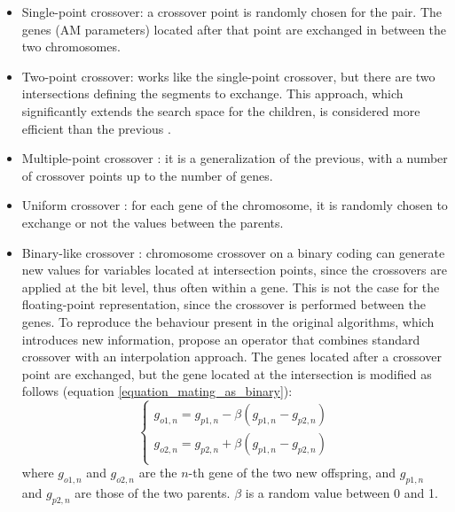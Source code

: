 \documentclass[twocol]{ametsoc}
\begin{document}
\begin{itemize}
	\item Single-point crossover: a crossover point is randomly chosen for the pair. The genes (AM parameters) located after that point are exchanged in between the two chromosomes.
	
	\item Two-point crossover: works like the single-point crossover, but there are two intersections defining the segments to exchange. This approach, which significantly extends the search space for the children, is considered more efficient than the previous \citep{Beasley1993a}.
	
	\item Multiple-point crossover \citep{DeJong1975a}: it is a generalization of the previous, with a number of crossover points up to the number of genes.
	
	\item Uniform crossover \citep{Syswerda1989}: for each gene of the chromosome, it is randomly chosen to exchange or not the values between the parents.
	
	\item Binary-like crossover \citep{Haupt2004}: chromosome crossover on a binary coding can generate new values for variables located at intersection points, since the crossovers are applied at the bit level, thus often within a gene. This is not the case for the floating-point representation, since the crossover is performed between the genes. To reproduce the behaviour present in the original algorithms, which introduces new information, \citet{Haupt2004} propose an operator that combines standard crossover with an interpolation approach. The genes located after a crossover point are exchanged, but the gene located at the intersection is modified as follows (equation \ref{equation_mating_as_binary}):
	\begin{equation}
	\left\lbrace \begin{array}{l} 
	g_{o1,n} = g_{p1,n} - \beta (g_{p1,n} - g_{p2,n}) \\
	g_{o2,n} = g_{p2,n} + \beta (g_{p1,n} - g_{p2,n}) \\
	\end{array} \right.
	\label{equation_mating_as_binary}
	\end{equation}
	where $g_{o1,n}$ and $g_{o2,n}$ are the $n$-th gene of the two new offspring, and $g_{p1,n}$ and $g_{p2,n}$ are those of the two parents. $\beta$ is a random value between 0 and 1.
	

\end{itemize}
\end{document}
